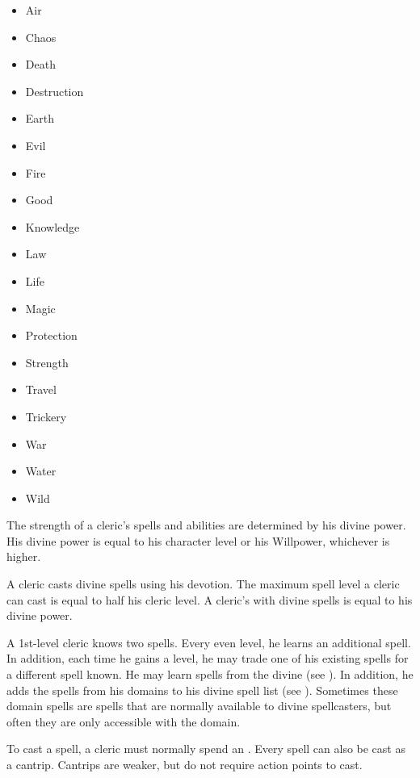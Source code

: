         \begin{itemize}
            \item{Air}
            \item{Chaos}
            \item{Death}
            \item{Destruction}
            \item{Earth}
            \item{Evil}
            \item{Fire}
            \item{Good}
            \item{Knowledge}
            \item{Law}
            \item{Life}
            \item{Magic}
            \item{Protection}
            \item{Strength}
            \item{Travel}
            \item{Trickery}
            \item{War}
            \item{Water}
            \item{Wild}
        \end{itemize}

        The strength of a cleric's spells and abilities are determined by his divine power.
        His divine power is equal to his character level or his Willpower, whichever is higher.

        A cleric casts divine spells using his devotion.
        The maximum spell level a cleric can cast is equal to half his cleric level.
        A cleric's  with divine spells is equal to his divine power.

        A 1st-level cleric knows two spells.
        Every even level, he learns an additional spell.
        In addition, each time he gains a level, he may trade one of his existing spells for a different spell known.
        He may learn spells from the divine  (see ).
        In addition, he adds the spells from his domains to his divine spell list (see ).
        Sometimes these domain spells are spells that are normally available to divine spellcasters, but often they are only accessible with the domain.

        To cast a spell, a cleric must normally spend an .
        Every spell can also be cast as a cantrip.
        Cantrips are weaker, but do not require action points to cast.

